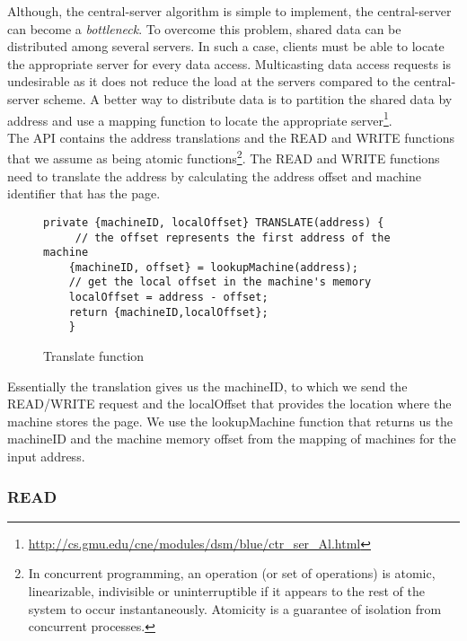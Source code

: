 \documentclass{article}      %
\begin{document}
Although, the central-server algorithm is simple to implement, the central-server can become a \emph{bottleneck}. To overcome this problem, shared data can be distributed among several servers. In such a case, clients must be able to locate the appropriate server for every data access. Multicasting data access requests is undesirable as it does not reduce the load at the servers compared to the central-server scheme. A better way to distribute data is to partition the shared data by address and use a mapping function to locate the appropriate server\footnote{\url{http://cs.gmu.edu/cne/modules/dsm/blue/ctr_ser_Al.html}}.\\

The API contains the address translations and the READ and WRITE functions that we assume as being atomic functions\footnote{In concurrent programming, an operation (or set of operations) is atomic, linearizable, indivisible or uninterruptible if it appears to the rest of the system to occur instantaneously. Atomicity is a guarantee of isolation from concurrent processes.}. The READ and WRITE functions need to translate the address by calculating the address offset and machine identifier that has the page.\\

\begin{figure}[htbp]
\begin{center}
\begin{lstlisting}
private {machineID, localOffset} TRANSLATE(address) {
	 // the offset represents the first address of the machine
	{machineID, offset} = lookupMachine(address);
	// get the local offset in the machine's memory
	localOffset = address - offset;   
	return {machineID,localOffset};  
	}
\end{lstlisting}
\caption{Translate function}
\label{Translate function}
\end{center}
\end{figure}

Essentially the translation gives us the machineID, to which we send the READ/WRITE request and the localOffset that provides the location where the machine stores the page. We use the lookupMachine function that returns us the machineID and the machine memory offset from the mapping of machines for the input address.\\

\subsubsection*{READ}
\end{document}
